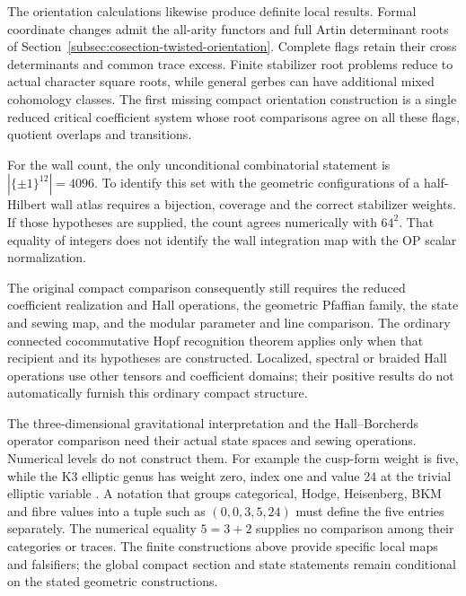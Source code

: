 The orientation calculations likewise produce definite local
results.  Formal coordinate changes admit the all-arity functors
and full Artin determinant roots of
Section~\ref{subsec:cosection-twisted-orientation}.  Complete flags
retain their cross determinants and common trace excess.  Finite
stabilizer root problems reduce to actual character square roots,
while general gerbes can have additional mixed cohomology classes.
The first missing compact orientation construction is a single
reduced critical coefficient system whose root comparisons agree
on all these flags, quotient overlaps and transitions.

For the wall count, the only unconditional combinatorial statement
is \(|\{\pm1\}^{12}|=4096\).  To identify this set with the
geometric configurations of a half-Hilbert wall atlas requires a
bijection, coverage and the correct stabilizer weights.  If those
hypotheses are supplied, the count agrees numerically with
\(64^2\).  That equality of integers does not identify the wall
integration map with the OP scalar normalization.

The original compact comparison consequently still requires the
reduced coefficient realization and Hall operations, the geometric
Pfaffian family, the state and sewing map, and the modular parameter
and line comparison.  The ordinary connected cocommutative Hopf
recognition theorem applies only when that recipient and its
hypotheses are constructed.  Localized, spectral or braided Hall
operations use other tensors and coefficient domains; their
positive results do not automatically furnish this ordinary
compact structure.

The three-dimensional gravitational interpretation and the
Hall--Borcherds operator comparison need their actual state spaces
and sewing operations.  Numerical levels do not construct them.
For example the cusp-form weight is five, while the K3 elliptic
genus has weight zero, index one and value 24 at the trivial
elliptic variable \cite{Gritsenko99}.  A notation that groups categorical, Hodge,
Heisenberg, BKM and fibre values into a tuple such as
\((0,0,3,5,24)\) must define the five entries separately.  The
numerical equality \(5=3+2\) supplies no comparison among their
categories or traces.  The finite constructions above provide
specific local maps and falsifiers; the global compact section
and state statements remain conditional on the stated geometric
constructions.
